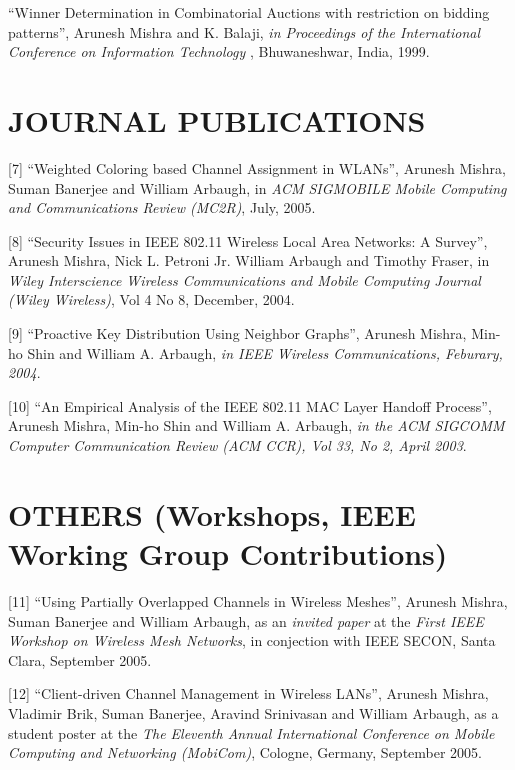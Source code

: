 \begin{resume}
[6] ``Winner Determination in Combinatorial Auctions with restriction on bidding patterns'', Arunesh Mishra and
K. Balaji, {\em in Proceedings of the International Conference on Information Technology }, Bhuwaneshwar, India, 1999.

\section{JOURNAL PUBLICATIONS}
\vspace{0.5cm}

[7] ``Weighted Coloring based Channel Assignment in WLANs'', Arunesh Mishra, Suman Banerjee and William Arbaugh,
in {\em ACM SIGMOBILE Mobile Computing and Communications Review (MC2R)}, July, 2005.


[8] ``Security Issues in IEEE 802.11 Wireless Local Area Networks: A Survey'', Arunesh Mishra, Nick L. Petroni Jr. William Arbaugh and Timothy Fraser, 
in {\em  Wiley Interscience Wireless Communications and Mobile Computing Journal (Wiley Wireless)}, Vol 4 No 8, December, 2004.

[9] ``Proactive Key Distribution Using Neighbor Graphs'', Arunesh Mishra,  Min-ho Shin and William A. Arbaugh,
{\em in IEEE Wireless Communications, Feburary, 2004}. 

[10] ``An Empirical Analysis of the IEEE 802.11 MAC Layer Handoff Process'', Arunesh Mishra,  
Min-ho Shin and William A. Arbaugh, {\em in the ACM SIGCOMM Computer Communication Review (ACM CCR),
Vol 33, No 2, April 2003}. 



\section{OTHERS (Workshops, IEEE Working Group Contributions)}

\vspace{0.5cm}

[11] ``Using Partially Overlapped Channels in Wireless Meshes'', Arunesh Mishra, Suman Banerjee and William Arbaugh,
as an {\em invited paper} at the {\em First IEEE Workshop on Wireless Mesh Networks}, in conjection with IEEE SECON,
Santa Clara, September 2005.

[12] ``Client-driven Channel Management in Wireless LANs'', Arunesh Mishra, Vladimir Brik, Suman Banerjee, Aravind Srinivasan
and William Arbaugh, as a student poster at  the {\em The Eleventh Annual International Conference on Mobile Computing and Networking (MobiCom)},
Cologne, Germany, September 2005.


\end{resume}
